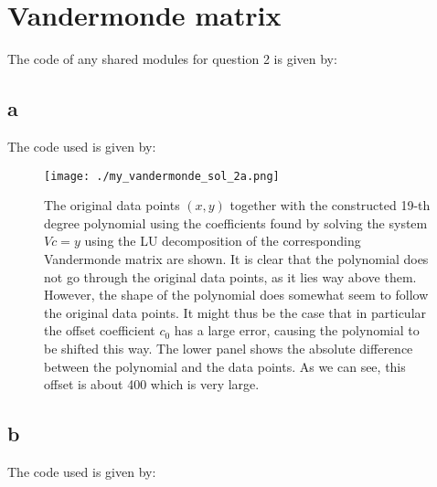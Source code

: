 \section{Vandermonde matrix}

The code of any shared modules for question 2 is given by:


\subsection{a}

The code used is given by:




\begin{figure}[h!]
    \centering
    \texttt{[image: ./my\_vandermonde\_sol\_2a.png]}
    \caption{The original data points $(x,y)$ together with the constructed 19-th degree polynomial
    using the coefficients found by solving the system $Vc=y$ using the LU decomposition of the corresponding Vandermonde matrix are shown.
    It is clear that the polynomial does not go through the original data points, as it lies way above them. However, the shape of the polynomial does somewhat seem to follow the original data points.
    It might thus be the case that in particular the offset coefficient $c_0$ has a large error, causing the polynomial to be shifted this way. The lower panel shows the absolute difference between
    the polynomial and the data points. As we can see, this offset is about 400 which is very large.}
    \label{fig:2a}
\end{figure}

\subsection{b}

The code used is given by:


